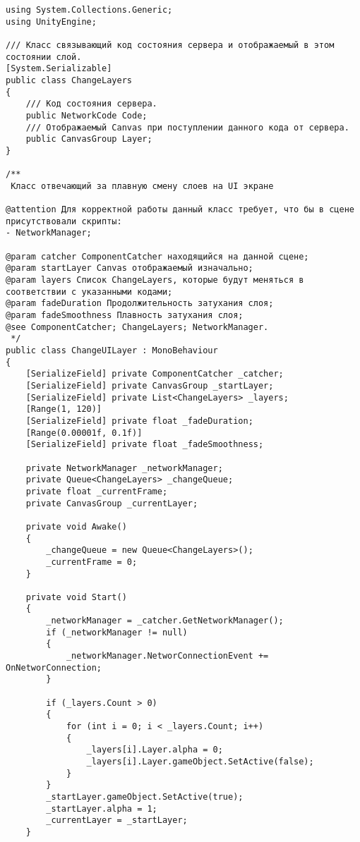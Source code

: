 \begin{verbatim}
﻿using System.Collections.Generic;
using UnityEngine;

/// Класс связывающий код состояния сервера и отображаемый в этом состоянии слой.
[System.Serializable]
public class ChangeLayers
{
    /// Код состояния сервера.
    public NetworkCode Code;
    /// Отображаемый Canvas при поступлении данного кода от сервера.
    public CanvasGroup Layer;
}

/**
 Класс отвечающий за плавную смену слоев на UI экране

@attention Для корректной работы данный класс требует, что бы в сцене присутствовали скрипты:
- NetworkManager;

@param catcher ComponentCatcher находящийся на данной сцене;
@param startLayer Canvas отображаемый изначально;
@param layers Список ChangeLayers, которые будут меняться в соответствии с указанными кодами;
@param fadeDuration Продолжительность затухания слоя;
@param fadeSmoothness Плавность затухания слоя;
@see ComponentCatcher; ChangeLayers; NetworkManager.
 */
public class ChangeUILayer : MonoBehaviour
{
    [SerializeField] private ComponentCatcher _catcher;
    [SerializeField] private CanvasGroup _startLayer;
    [SerializeField] private List<ChangeLayers> _layers;
    [Range(1, 120)]
    [SerializeField] private float _fadeDuration;
    [Range(0.00001f, 0.1f)]
    [SerializeField] private float _fadeSmoothness;

    private NetworkManager _networkManager;
    private Queue<ChangeLayers> _changeQueue;
    private float _currentFrame;
    private CanvasGroup _currentLayer;

    private void Awake()
    {
        _changeQueue = new Queue<ChangeLayers>();
        _currentFrame = 0;
    }

    private void Start()
    {
        _networkManager = _catcher.GetNetworkManager();
        if (_networkManager != null)
        {
            _networkManager.NetworConnectionEvent += OnNetworConnection;
        }

        if (_layers.Count > 0)
        {
            for (int i = 0; i < _layers.Count; i++)
            {
                _layers[i].Layer.alpha = 0;
                _layers[i].Layer.gameObject.SetActive(false);
            }
        }
        _startLayer.gameObject.SetActive(true);
        _startLayer.alpha = 1;
        _currentLayer = _startLayer;
    }


\end{verbatim}
